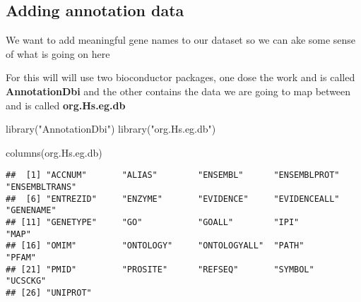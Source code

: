 \documentclass[
]{article}
\newenvironment{Shaded}{\begin{snugshade}}{\end{snugshade}}
\newcommand{\AttributeTok}[1]{\textcolor[rgb]{0.77,0.63,0.00}{#1}}
\newcommand{\CommentTok}[1]{\textcolor[rgb]{0.56,0.35,0.01}{\textit{#1}}}
\newcommand{\FunctionTok}[1]{\textcolor[rgb]{0.00,0.00,0.00}{#1}}
\newcommand{\NormalTok}[1]{#1}
\newcommand{\OtherTok}[1]{\textcolor[rgb]{0.56,0.35,0.01}{#1}}
\newcommand{\SpecialCharTok}[1]{\textcolor[rgb]{0.00,0.00,0.00}{#1}}
\newcommand{\StringTok}[1]{\textcolor[rgb]{0.31,0.60,0.02}{#1}}
\begin{document}
\hypertarget{adding-annotation-data}{%
\subsection{Adding annotation data}\label{adding-annotation-data}}

We want to add meaningful gene names to our dataset so we can ake some
sense of what is going on here

For this will will use two bioconductor packages, one dose the work and
is called \textbf{AnnotationDbi} and the other contains the data we are
going to map between and is called \textbf{org.Hs.eg.db}

\begin{Shaded}
\begin{Highlighting}[]
\FunctionTok{library}\NormalTok{(}\StringTok{"AnnotationDbi"}\NormalTok{)}
\FunctionTok{library}\NormalTok{(}\StringTok{"org.Hs.eg.db"}\NormalTok{)}
\end{Highlighting}
\end{Shaded}

\begin{Shaded}
\begin{Highlighting}[]
\FunctionTok{columns}\NormalTok{(org.Hs.eg.db)}
\end{Highlighting}
\end{Shaded}

\begin{verbatim}
##  [1] "ACCNUM"       "ALIAS"        "ENSEMBL"      "ENSEMBLPROT"  "ENSEMBLTRANS"
##  [6] "ENTREZID"     "ENZYME"       "EVIDENCE"     "EVIDENCEALL"  "GENENAME"    
## [11] "GENETYPE"     "GO"           "GOALL"        "IPI"          "MAP"         
## [16] "OMIM"         "ONTOLOGY"     "ONTOLOGYALL"  "PATH"         "PFAM"        
## [21] "PMID"         "PROSITE"      "REFSEQ"       "SYMBOL"       "UCSCKG"      
## [26] "UNIPROT"
\end{verbatim}

\begin{Shaded}
\end{Shaded}
\end{document}
